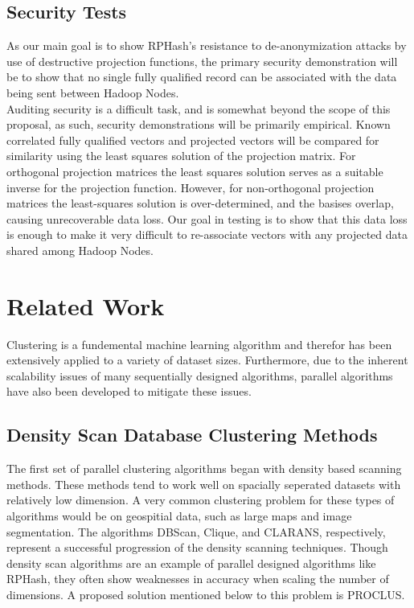 \documentclass[a4paper,10pt]{article}
\begin{document}
\subsection{Security Tests}
As our main goal is to show RPHash's resistance to de-anonymization attacks by use of destructive
projection functions, the primary security demonstration will be to show that no single fully qualified
record can be associated with the data being sent between Hadoop Nodes.\\
Auditing security is a difficult task, and is somewhat beyond the scope of this proposal,
as such, security demonstrations will be primarily empirical. Known correlated fully qualified
vectors and projected vectors will be compared for similarity using the least squares solution
of the projection matrix. For orthogonal projection matrices the least squares solution serves 
as a suitable inverse for the projection function. However, for non-orthogonal projection matrices
the least-squares solution is over-determined, and the basises overlap, causing unrecoverable
data loss. Our goal in testing is to show that this data loss is enough to make it 
very difficult to re-associate vectors with any projected data shared among Hadoop Nodes.\\ 

\section{Related Work}
Clustering is a fundemental machine learning algorithm and therefor has been 
extensively applied to a variety of dataset sizes. Furthermore, due to the inherent
scalability issues of many sequentially designed algorithms, parallel
algorithms have also been developed to mitigate these issues.
\subsection{Density Scan Database Clustering Methods}
The first set of parallel clustering algorithms began with density based scanning 
methods. These methods tend to work well on spacially seperated datasets with relatively
low dimension. A very common clustering problem for these types of algorithms
would be on geospitial data, such as large maps and image segmentation. The algorithms
DBScan\cite{dbscan}, Clique\cite{clique}, and CLARANS\cite{clarans}, respectively, represent a 
successful progression of the density scanning techniques.
Though density scan algorithms are an example of parallel designed algorithms
like RPHash, they often show weaknesses in accuracy when scaling the number of dimensions. 
A proposed solution mentioned below to this problem is PROCLUS\cite{proclus}.
\end{document}
